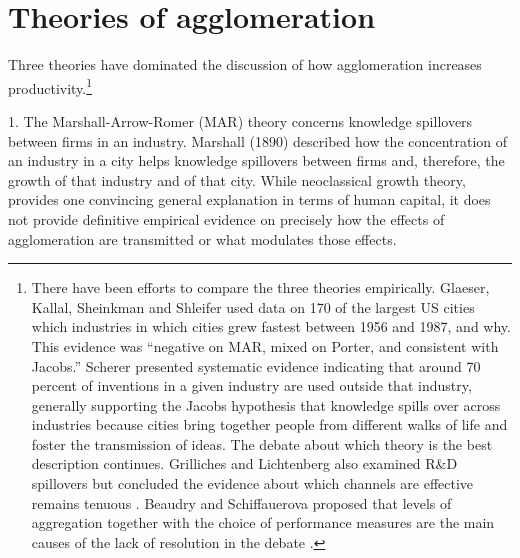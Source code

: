 

\section{Theories of agglomeration}
Three theories have dominated the discussion of how agglomeration increases productivity.\footnote{There have been efforts to compare the three theories empirically. Glaeser, Kallal, Sheinkman and Shleifer \cite{glaeserGrowthCities1991} used data on 170 of the largest US cities which industries in which cities grew fastest between 1956 and 1987, and why. %
This evidence was ``negative on MAR, mixed on Porter, and consistent with Jacobs.'' Scherer \cite{schererInterindustryTechnologyFlows1982} presented systematic evidence indicating that around 70 percent of inventions in a given industry are used outside that industry, generally supporting the Jacobs hypothesis that knowledge spills over across industries because cities bring together people from different walks of life and foster the transmission of ideas. The debate about which theory is the best description continues. Grilliches and Lichtenberg also examined R\&D spillovers but concluded the evidence about which channels are effective remains tenuous \cite{grilichesInterindustryTechnologyFlows1984}. Beaudry and Schiffauerova proposed that levels of aggregation together with the choice of performance measures are the main causes of the lack of resolution in the debate  \cite{beaudryWhoRightMarshall2009}.}

1. The Marshall-Arrow-Romer (MAR) theory concerns knowledge spillovers between firms in an industry.  Marshall (1890) described how the concentration of an industry in a city helps knowledge spillovers between firms and, therefore, the growth of that industry and of that city. While neoclassical growth theory, provides one convincing general explanation in terms of human capital, it does not provide definitive empirical evidence on precisely how the effects of agglomeration are transmitted or what modulates those effects. 

